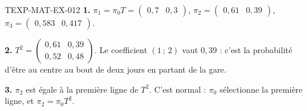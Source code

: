 \begin{corrige}{TEXP-MAT-EX-012}
\textbf{1.} $\pi_1=\pi_0T=\begin{pmatrix}0{,}7&0{,}3\end{pmatrix}$,
$\pi_2=\begin{pmatrix}0{,}61&0{,}39\end{pmatrix}$,
$\pi_3=\begin{pmatrix}0{,}583&0{,}417\end{pmatrix}$.

\textbf{2.} $T^2=\begin{pmatrix}0{,}61&0{,}39\\0{,}52&0{,}48\end{pmatrix}$.
Le coefficient $(1\,;\,2)$ vaut $0{,}39$ : c'est la probabilité d'être au
centre au bout de deux jours en partant de la gare.

\textbf{3.} $\pi_2$ est égale à la première ligne de $T^2$. C'est normal :
$\pi_0$ sélectionne la première ligne, et $\pi_2=\pi_0T^2$.
\end{corrige}
